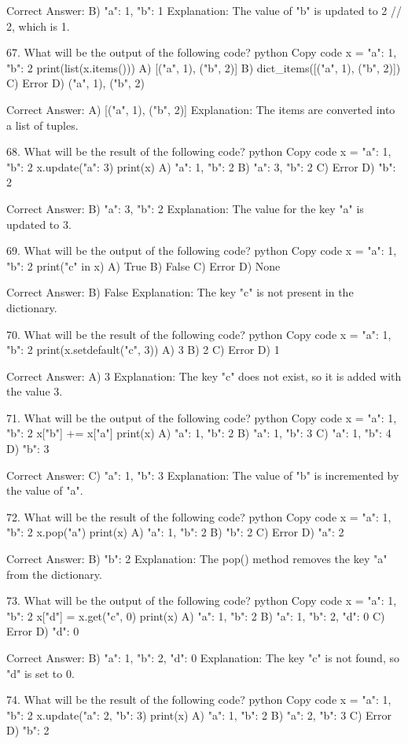 Correct Answer: B) {"a": 1, "b": 1}
Explanation: The value of "b" is updated to 2 // 2, which is 1.

67. What will be the output of the following code?
python
Copy code
x = {"a": 1, "b": 2}
print(list(x.items()))
A) [("a", 1), ("b", 2)]
B) dict_items([("a", 1), ("b", 2)])
C) Error
D) {("a", 1), ("b", 2)}

Correct Answer: A) [("a", 1), ("b", 2)]
Explanation: The items are converted into a list of tuples.

68. What will be the result of the following code?
python
Copy code
x = {"a": 1, "b": 2}
x.update({"a": 3})
print(x)
A) {"a": 1, "b": 2}
B) {"a": 3, "b": 2}
C) Error
D) {"b": 2}

Correct Answer: B) {"a": 3, "b": 2}
Explanation: The value for the key "a" is updated to 3.

69. What will be the output of the following code?
python
Copy code
x = {"a": 1, "b": 2}
print("c" in x)
A) True
B) False
C) Error
D) None

Correct Answer: B) False
Explanation: The key "c" is not present in the dictionary.

70. What will be the result of the following code?
python
Copy code
x = {"a": 1, "b": 2}
print(x.setdefault("c", 3))
A) 3
B) 2
C) Error
D) 1

Correct Answer: A) 3
Explanation: The key "c" does not exist, so it is added with the value 3.

71. What will be the output of the following code?
python
Copy code
x = {"a": 1, "b": 2}
x["b"] += x["a"]
print(x)
A) {"a": 1, "b": 2}
B) {"a": 1, "b": 3}
C) {"a": 1, "b": 4}
D) {"b": 3}

Correct Answer: C) {"a": 1, "b": 3}
Explanation: The value of "b" is incremented by the value of "a".

72. What will be the result of the following code?
python
Copy code
x = {"a": 1, "b": 2}
x.pop("a")
print(x)
A) {"a": 1, "b": 2}
B) {"b": 2}
C) Error
D) {"a": 2}

Correct Answer: B) {"b": 2}
Explanation: The pop() method removes the key "a" from the dictionary.

73. What will be the output of the following code?
python
Copy code
x = {"a": 1, "b": 2}
x["d"] = x.get("c", 0)
print(x)
A) {"a": 1, "b": 2}
B) {"a": 1, "b": 2, "d": 0}
C) Error
D) {"d": 0}

Correct Answer: B) {"a": 1, "b": 2, "d": 0}
Explanation: The key "c" is not found, so "d" is set to 0.

74. What will be the result of the following code?
python
Copy code
x = {"a": 1, "b": 2}
x.update({"a": 2, "b": 3})
print(x)
A) {"a": 1, "b": 2}
B) {"a": 2, "b": 3}
C) Error
D) {"b": 2}

